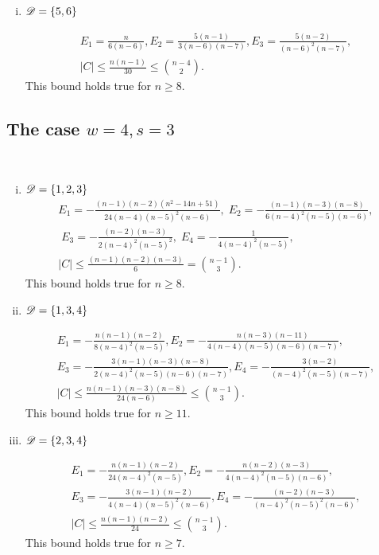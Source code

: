 \documentclass{amsart}
\begin{document}
{\begin{enumerate}[(i)]
\item $\mathscr{D} = \{5, 6\}$

\begin{gather*}
E_1=\frac{n}{6(n-6)},E_2=\frac{5(n-1)}{3 (n-6)(n-7)},E_3=\frac{5 (n-2)}{(n-6)^2(n-7) },\\
|C| \leq \frac{n(n-1)}{30} \leq \binom{n-4}{2}.
\end{gather*}
This bound holds true for $n\ge8.$

\end{enumerate}

\subsection{The case \texorpdfstring{$w=4,s=3$}.}  \label{App:4,3}\hfill\\
\begin{enumerate}[(i)]
\item $\mathscr{D}=\{1,2,3\}$
\begin{gather*}
  E_1=-\frac{(n-1)(n-2)\left(n^2-14n+51\right)}{24(n-4)(n-5)^2(n-6)}, \;E_2=-\frac{(n-1)(n-3)(n-8)}{6(n-4)^2(n-5)(n-6)},\\
  \;E_3=-\frac{(n-2)(n-3)}{2(n-4)^2(n-5)^2},\;
  E_4=-\frac{1}{4(n-4)^{2}(n-5)}, \\
  |C| \leq \frac{(n-1)(n-2)(n-3)}{6} = \binom{n-1}{3}.
\end{gather*}
This bound holds true for $n\geq 8$.

\item $\mathscr{D}=\{1,3,4\}$

\begin{gather*}
E_1=-\frac{n(n-1) (n-2)}{8(n-4)^2(n-5)}, E_2=-\frac{n(n-3) (n-11)}{4(n-4)(n-5)(n-6) (n-7)},\\ E_3=-\frac{3(n-1)(n-3)(n-8)}{2 (n-4)^2(n-5)(n-6)(n-7)},
E_4=-\frac{3(n-2)}{(n-4)^2(n-5)(n-7)},\\
|C|\le \frac{n(n-1)(n-3)(n-8)}{24(n-6)}\le \binom{n-1}{3}.
\end{gather*}
This bound holds true for $n\ge 11.$

\item $\mathscr{D}=\{2,3,4\}$

\begin{gather*}
E_1=-\frac{n(n-1)(n-2)}{24(n-4)^2(n-5)}, E_2=-\frac{n(n-2) (n-3)}{4(n-4)^2(n-5) (n-6)},\\ E_3=-\frac{3(n-1)(n-2)}{4(n-4)(n-5)^2(n-6)},
E_4=-\frac{(n-2)(n-3)}{(n-4)^2(n-5)^2(n-6)},\\
|C|\le \frac{n(n-1)(n-2)}{24}\le \binom{n-1}{3}. 
\end{gather*}
This bound holds true for $n\ge 7.$


\end{enumerate}}
\end{document}
